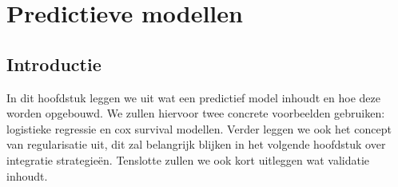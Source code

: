 \chapter{Predictieve modellen}
\label{cha:D:predictieve-modellen}

\section{Introductie}
\label{sec:D:pm-introduction}
In dit hoofdstuk leggen we uit wat een predictief model inhoudt en hoe deze worden opgebouwd. We zullen hiervoor twee concrete voorbeelden gebruiken: logistieke regressie en cox survival modellen. Verder leggen we ook het concept van regularisatie uit, dit zal belangrijk blijken in het volgende hoofdstuk over integratie strategie\"en. Tenslotte zullen we ook kort uitleggen wat validatie inhoudt.

